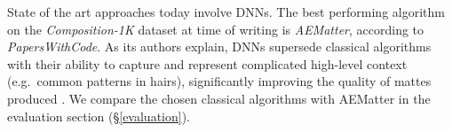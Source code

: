 \documentclass{article}
\begin{document}
\begin{multicols}{2}[]
State of the art approaches today involve DNNs. The best performing algorithm on the \emph{Composition-1K} dataset at time of writing is \emph{AEMatter}, according to \emph{PapersWithCode}. As its authors explain, DNNs supersede classical algorithms with their ability to capture and represent complicated high-level context (e.g.\ common patterns in hairs), significantly improving the quality of mattes produced \cite{sota-composition-1k}. We compare the chosen classical algorithms with AEMatter in the evaluation section (\S\ref{evaluation}).




\end{multicols}
\end{document}
